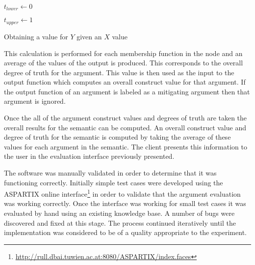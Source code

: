 \begin{algorithm}[H]
\SetAlgoLined
{}

$t_{lower} \leftarrow 0$

$t_{upper} \leftarrow 1$

\caption{Obtaining a value for $Y$ given an $X$ value}
\label{alg:bin_search}
\end{algorithm}

This calculation is performed for each membership function in the node and an average of the values of the output is produced. This corresponds to the overall degree of truth for the argument. This value is then used as the input to the output function which computes an overall construct value for that argument. If the output function of an argument is labeled as a mitigating argument then that argument is ignored.

Once the all of the argument construct values and degrees of truth are taken the overall results for the semantic can be computed. An overall construct value and degree of truth for the semantic is computed by taking the average of these values for each argument in the semantic. The client presents this information to the user in the evaluation interface previously presented.

The software was manually validated in order to determine that it was functioning correctly. Initially simple test cases were developed using the ASPARTIX online interface\footnote{\url{http://rull.dbai.tuwien.ac.at:8080/ASPARTIX/index.faces}} in order to validate that the argument evaluation was working correctly. Once the interface was working for small test cases it was evaluated by hand using an existing knowledge base. A number of bugs were discovered and fixed at this stage. The process continued iteratively until the implementation was considered to be of a quality appropriate to the experiment.

